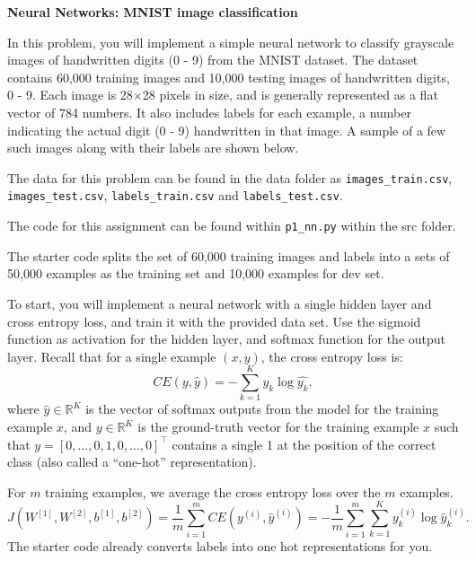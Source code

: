 \clearpage
\item {} {\bf Neural Networks: MNIST image classification}

In this problem, you will implement a simple neural network
to classify grayscale images of handwritten digits (0 - 9) from
the MNIST dataset. The dataset contains 60,000 training images and
10,000 testing images of handwritten digits, 0 - 9. Each image is
28$\times$28 pixels in size, and is generally represented as a flat
vector of 784 numbers. It also includes labels for each example, a number
indicating the actual digit (0 - 9) handwritten in that image. A sample of
a few such images along with their labels are shown below.


The data for this problem can be found in the data folder as \texttt{images\_train.csv}, \texttt{images\_test.csv}, \texttt{labels\_train.csv} and \texttt{labels\_test.csv}.


The code for this assignment can be found within \texttt{p1\_nn.py} within the src folder.

The starter code splits the set
of 60,000 training images and labels into a sets of 50,000 examples as
the training set and 10,000 examples for dev set.

To start, you will implement a neural network with a single hidden layer
and cross entropy loss, and train it with the provided data set. Use the
sigmoid function as activation for the hidden layer, and softmax function
for the output layer. Recall that for a single example $(x, y)$, the cross
entropy loss is:
$$CE(y, \hat{y}) = - \sum_{k=1}^K y_k \log \hat{y_k},$$
where $\hat{y} \in \mathbb{R}^{K}$ is the vector of softmax outputs
from the model for the training example $x$,
and $y \in \mathbb{R}^{K}$ is the ground-truth vector for the training example
$x$ such that $y = [0,...,0,1,0,...,0]^\top$ contains a single 1 at the
position of the correct class (also called a ``one-hot'' representation).

For $m$ training examples, we average the cross entropy loss over the $m$ examples.
  \begin{equation*}
  J(W^{[1]},W^{[2]},b^{[1]},b^{[2]}) = \frac{1}{m}\sum_{i=1}^m CE(y^{(i)}, \hat{y}^{(i)}) = - \frac{1}{m}\sum_{i=1}^m \sum_{k=1}^K y_k^{(i)} \log \hat{y}_k^{(i)}.
  \end{equation*}
The starter code already converts labels into one hot representations for you.

